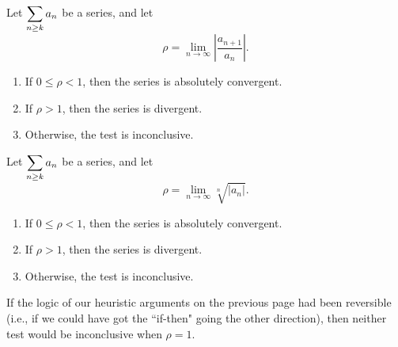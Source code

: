 \newpage

\begin{theorem}
Let $\displaystyle\sum_{n\ge k} a_n$ be a series, and let
\begin{equation*}
\rho=\lim_{n\to\infty}\left|\frac{a_{n+1}}{a_n}\right|.
\end{equation*}
\begin{enumerate}
\item If $0\le \rho< 1$, then the series is absolutely convergent.
\item If $\rho>1$, then the series is divergent.
\item Otherwise, the test is inconclusive.
\end{enumerate}
\end{theorem}

\begin{theorem}
Let $\displaystyle\sum_{n\ge k} a_n$ be a series, and let
\begin{equation*}
\rho=\lim_{n\to\infty}\sqrt[n]{|a_n|}.
\end{equation*}
\begin{enumerate}
\item If $0\le \rho< 1$, then the series is absolutely convergent.
\item If $\rho>1$, then the series is divergent.
\item Otherwise, the test is inconclusive.
\end{enumerate}
\end{theorem}

\begin{remark}
If the logic of our heuristic arguments on the previous page had been reversible (i.e., if we could have got the ``if-then" going the other direction), then neither test would be inconclusive when $\rho=1$.
\end{remark}

\newpage

